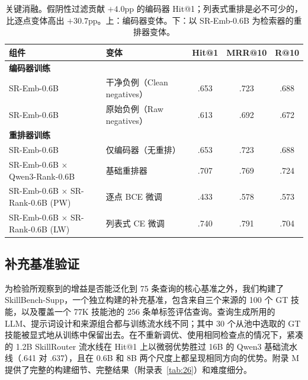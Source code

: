 \documentclass[11pt,UTF8,fontset=fandol]{ctexart}
\makeatletter
\newcommand{\Hit}{Hit@1}
\makeatother
\begin{document}
\begin{table}[H]\centering
\caption{关键消融。假阴性过滤贡献 $+4.0$pp 的编码器 \Hit{}；列表式重排是必不可少的，比逐点变体高出 $+30.7$pp。上：编码器变体。下：以 SR-Emb-0.6B 为检索器的重排器变体。}
\begin{tabular}{llccc}
\toprule
组件 & 变体 & \Hit{} & MRR@10 & R@10 \\ \midrule
\multicolumn{5}{l}{\textbf{编码器训练}} \\
SR-Emb-0.6B & 干净负例（Clean negatives） & .653 & .723 & .688 \\
SR-Emb-0.6B & 原始负例（Raw negatives） & .613 & .692 & .672 \\
\multicolumn{5}{l}{\textbf{重排器训练}} \\
SR-Emb-0.6B & 仅编码器（无重排） & .653 & .723 & .688 \\
SR-Emb-0.6B $\times$ Qwen3-Rank-0.6B & 基础重排器 & .707 & .769 & .724 \\
SR-Emb-0.6B $\times$ SR-Rank-0.6B (PW) & 逐点 BCE 微调 & .433 & .578 & .573 \\
SR-Emb-0.6B $\times$ SR-Rank-0.6B (LW) & 列表式 CE 微调 & .740 & .791 & .704 \\
\bottomrule
\end{tabular}
\label{tab:5}
\end{table}

\subsection{补充基准验证}

为检验所观察到的增益是否能泛化到 75 条查询的核心基准之外，我们构建了 SkillBench-Supp，一个独立构建的补充基准，包含来自三个来源的 100 个 GT 技能，以及覆盖一个 77K 技能池的 256 条单标签评估查询。查询生成所用的 LLM、提示词设计和来源组合都与训练流水线不同；其中 30 个从池中选取的 GT 技能被显式地从训练中保留出去。在不重新调优、使用相同检查点的情况下，紧凑的 1.2B SkillRouter 流水线在 \Hit{} 上以微弱优势胜过 16B 的 Qwen3 基础流水线（.641 对 .637），且在 0.6B 和 8B 两个尺度上都呈现相同方向的优势。附录 M 提供了完整的构建细节、完整结果（附录表~\ref{tab:26}）和难度细分。
\end{document}
